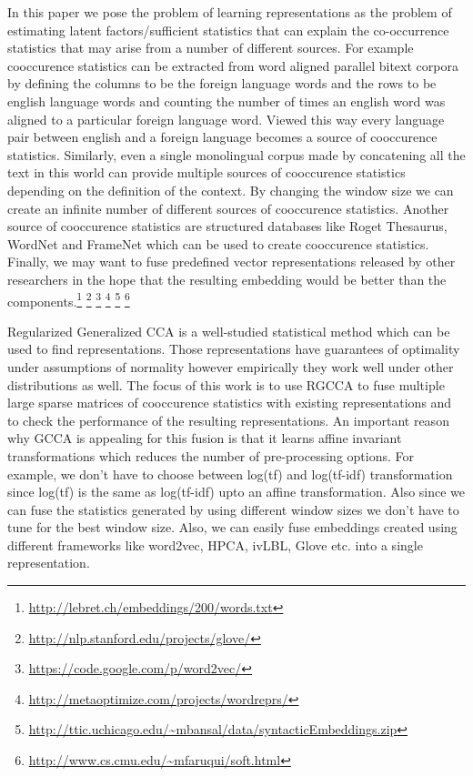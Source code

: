 \documentclass[11pt]{article}
\begin{document}
In this paper we pose the problem of learning representations as the
problem of estimating latent factors/sufficient statistics that can explain the
co-occurrence statistics that may arise from a number of different
sources. For example cooccurence statistics can be extracted from
word aligned parallel bitext corpora by defining the columns to be the
foreign language words and the rows to be english language words and
counting the number of times an english word was aligned to a
particular foreign language word. Viewed this way every language pair between english
and a foreign language becomes a source of cooccurence
statistics. Similarly, even a single monolingual corpus made by
concatening all the text in this world can provide multiple sources of
cooccurence statistics depending on the definition of the
context. By changing the window size we can create an infinite number
of different sources of cooccurence statistics. Another source of
cooccurence statistics are structured databases like Roget Thesaurus,
WordNet and FrameNet which can be used to create cooccurence
statistics. Finally, we may want to fuse predefined vector
representations released by other
researchers in the hope that the resulting embedding would be better
than the components.\footnote{\url{http://lebret.ch/embeddings/200/words.txt}}
  \footnote{\url{http://nlp.stanford.edu/projects/glove/}}
  \footnote{\url{https://code.google.com/p/word2vec/}}
  \footnote{\url{http://metaoptimize.com/projects/wordreprs/}}
  \footnote{\url{http://ttic.uchicago.edu/~mbansal/data/syntacticEmbeddings.zip}}
  \footnote{\url{http://www.cs.cmu.edu/~mfaruqui/soft.html}}


Regularized Generalized CCA is a well-studied statistical method which
can be used to find representations. Those representations have
guarantees of optimality under assumptions of normality however
empirically they work well under other distributions as well. The
focus of this work is to use RGCCA to fuse multiple large sparse
matrices of cooccurence statistics with existing representations and to
check the performance of the resulting representations.
An important reason why GCCA is appealing for this fusion is that it
learns affine invariant transformations which reduces the number of
pre-processing options. For example, we don't have to choose 
between log(tf) and log(tf-idf) transformation since log(tf) is the
same as log(tf-idf) upto an affine transformation. Also since we can
fuse the statistics generated by 
using different window sizes we don't have to tune for the best window
size. Also, we can easily fuse embeddings created using
different frameworks like word2vec, HPCA, ivLBL, Glove etc. into a single representation.
\end{document}
